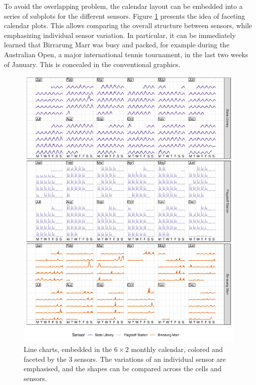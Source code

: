 \documentclass[12pt]{article}
\begin{document}
To avoid the overlapping problem, the calendar layout can be embedded into a series of subplots for the different sensors. Figure \ref{fig:facet} presents the idea of faceting calendar plots. This allows comparing the overall structure between sensors, while emphasizing individual sensor variation. In particular, it can be immediately learned that Birrarung Marr was busy and packed, for example during the Australian Open, a major international tennis tournament, in the last two weeks of January. This is concealed in the conventional graphics.

\begin{figure}

{\centering \includegraphics[width=\textwidth]{figure/facet-1} 

}

\caption{Line charts, embedded in the \(6 \times 2\) monthly calendar, colored and faceted by the 3 sensors. The variations of an individual sensor are emphasised, and the shapes can be compared across the cells and sensors.}\label{fig:facet}
\end{figure}
\end{document}
